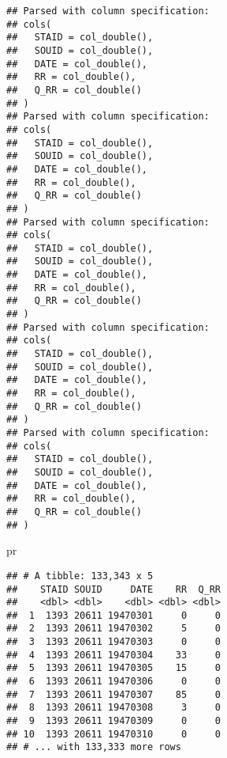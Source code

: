 \documentclass[]{article}
\newenvironment{Shaded}{\begin{snugshade}}{\end{snugshade}}
\newcommand{\KeywordTok}[1]{\textcolor[rgb]{0.13,0.29,0.53}{\textbf{#1}}}
\newcommand{\DataTypeTok}[1]{\textcolor[rgb]{0.13,0.29,0.53}{#1}}
\newcommand{\DecValTok}[1]{\textcolor[rgb]{0.00,0.00,0.81}{#1}}
\newcommand{\StringTok}[1]{\textcolor[rgb]{0.31,0.60,0.02}{#1}}
\newcommand{\CommentTok}[1]{\textcolor[rgb]{0.56,0.35,0.01}{\textit{#1}}}
\newcommand{\OtherTok}[1]{\textcolor[rgb]{0.56,0.35,0.01}{#1}}
\newcommand{\OperatorTok}[1]{\textcolor[rgb]{0.81,0.36,0.00}{\textbf{#1}}}
\newcommand{\NormalTok}[1]{#1}
\begin{document}
\begin{verbatim}
## Parsed with column specification:
## cols(
##   STAID = col_double(),
##   SOUID = col_double(),
##   DATE = col_double(),
##   RR = col_double(),
##   Q_RR = col_double()
## )
## Parsed with column specification:
## cols(
##   STAID = col_double(),
##   SOUID = col_double(),
##   DATE = col_double(),
##   RR = col_double(),
##   Q_RR = col_double()
## )
## Parsed with column specification:
## cols(
##   STAID = col_double(),
##   SOUID = col_double(),
##   DATE = col_double(),
##   RR = col_double(),
##   Q_RR = col_double()
## )
## Parsed with column specification:
## cols(
##   STAID = col_double(),
##   SOUID = col_double(),
##   DATE = col_double(),
##   RR = col_double(),
##   Q_RR = col_double()
## )
## Parsed with column specification:
## cols(
##   STAID = col_double(),
##   SOUID = col_double(),
##   DATE = col_double(),
##   RR = col_double(),
##   Q_RR = col_double()
## )
\end{verbatim}

\begin{Shaded}
\begin{Highlighting}[]
\NormalTok{pr}
\end{Highlighting}
\end{Shaded}

\begin{verbatim}
## # A tibble: 133,343 x 5
##    STAID SOUID     DATE    RR  Q_RR
##    <dbl> <dbl>    <dbl> <dbl> <dbl>
##  1  1393 20611 19470301     0     0
##  2  1393 20611 19470302     5     0
##  3  1393 20611 19470303     0     0
##  4  1393 20611 19470304    33     0
##  5  1393 20611 19470305    15     0
##  6  1393 20611 19470306     0     0
##  7  1393 20611 19470307    85     0
##  8  1393 20611 19470308     3     0
##  9  1393 20611 19470309     0     0
## 10  1393 20611 19470310     0     0
## # ... with 133,333 more rows
\end{verbatim}

\begin{Shaded}
\end{Shaded}
\end{document}
